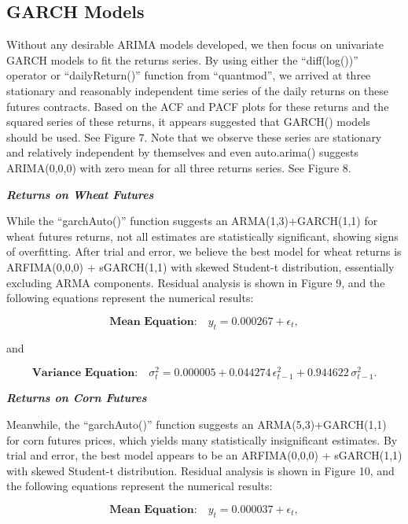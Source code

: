 \documentclass[11pt]{article}
\begin{document}
\subsection{GARCH Models}

Without any desirable ARIMA models developed, we then focus on univariate GARCH models to fit the returns series. By using either the ``diff(log())'' operator or ``dailyReturn()'' function from ``quantmod'', we arrived at three stationary and reasonably independent time series of the daily returns on these futures contracts. Based on the ACF and PACF plots for these returns and the squared series of these returns, it appears suggested that GARCH() models should be used. See Figure 7. Note that we observe these series are stationary and relatively independent by themselves and even auto.arima() suggests ARIMA(0,0,0) with zero mean for all three returns series. See Figure 8.

\textbf{\emph{Returns on Wheat Futures}}

While the ``garchAuto()'' function suggests an ARMA(1,3)+GARCH(1,1) for wheat futures returns, not all estimates are statistically significant, showing signs of overfitting. After trial and error, we believe the best model for wheat returns is ARFIMA(0,0,0) + sGARCH(1,1) with skewed Student-t distribution, essentially excluding ARMA components. Residual analysis is shown in Figure 9, and the following equations represent the numerical results:

\begin{equation}
\textbf{Mean Equation:} \quad y_{t} = 0.000267 + \epsilon_{t},
\end{equation}

and

\begin{equation}
\textbf{Variance Equation:} \quad \sigma_{t}^{2} = 0.000005 + 0.044274\,\epsilon_{t-1}^{2} + 0.944622\,\sigma_{t-1}^{2}.
\end{equation}

\textbf{\emph{Returns on Corn Futures}}

Meanwhile, the ``garchAuto()'' function suggests an ARMA(5,3)+GARCH(1,1) for corn futures prices, which yields many statistically insignificant estimates. By trial and error, the best model appears to be an ARFIMA(0,0,0) + sGARCH(1,1) with skewed Student-t distribution. Residual analysis is shown in Figure 10, and the following equations represent the numerical results:

\begin{equation}
\textbf{Mean Equation:} \quad y_{t} = 0.000037 + \epsilon_{t},
\end{equation}
\end{document}
